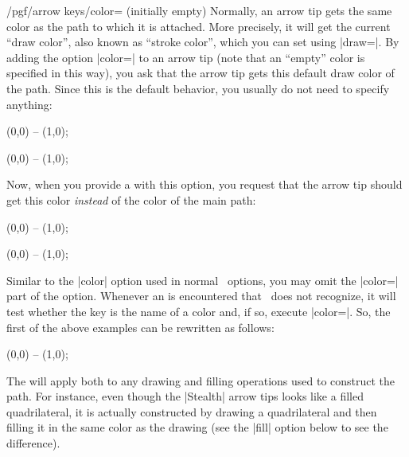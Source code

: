 \begin{key}{/pgf/arrow keys/color= (initially \normalfont empty)}
    Normally, an arrow tip gets the same color as the path to which it is
    attached. More precisely, it will get the current ``draw color'', also
    known as ``stroke color'', which you can set using |draw=|. By adding the option |color=| to an arrow tip (note that an
    ``empty'' color is specified in this way), you ask that the arrow tip gets
    this default draw color of the path. Since this is the default behavior,
    you usually do not need to specify anything:
\begin{codeexample}[width=3cm,preamble={\usetikzlibrary{arrows.meta}}]
 \draw [red, arrows = {-Stealth}] (0,0) -- (1,0);
\end{codeexample}
\begin{codeexample}[width=3cm,preamble={\usetikzlibrary{arrows.meta}}]
 \draw [blue, arrows = {-Stealth}] (0,0) -- (1,0);
\end{codeexample}

    Now, when you provide a  with this option, you request that the
    arrow tip should get this color \emph{instead} of the color of the main
    path:
\begin{codeexample}[width=3cm,preamble={\usetikzlibrary{arrows.meta}}]
 \draw [red, arrows = {-Stealth[color=blue]}] (0,0) -- (1,0);
\end{codeexample}
\begin{codeexample}[width=3cm,preamble={\usetikzlibrary{arrows.meta}}]
 \draw [red, arrows = {-Stealth[color=black]}] (0,0) -- (1,0);
\end{codeexample}

    Similar to the |color| option used in normal \tikzname\ options, you may
    omit the |color=| part of the option. Whenever an  is
    encountered that \tikzname\ does not recognize, it will test whether the
    key is the name of a color and, if so, execute |color=|.
    So, the first of the above examples can be rewritten as follows:
\begin{codeexample}[width=3cm,preamble={\usetikzlibrary{arrows.meta}}]
 \draw [red, arrows = {-Stealth[blue]}] (0,0) -- (1,0);
\end{codeexample}

    The  will apply both to any drawing and filling operations used
    to construct the path. For instance, even though the |Stealth| arrow tips
    looks like a filled quadrilateral, it is actually constructed by drawing a
    quadrilateral and then filling it in the same color as the drawing (see the
    |fill| option below to see the difference).


\end{key}
